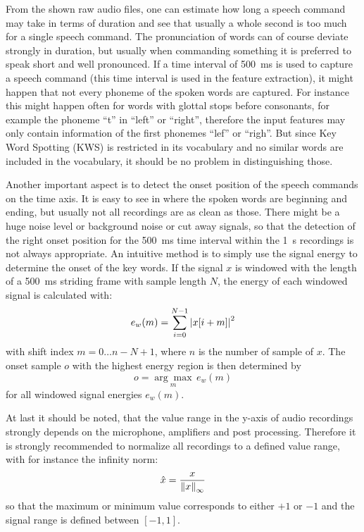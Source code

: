 From the shown raw audio files, one can estimate how long a speech command may take in terms of duration and see that usually a whole second is too much for a single speech command.
The pronunciation of words can of course deviate strongly in duration, but usually when commanding something it is preferred to speak short and well pronounced.
If a time interval of \SI{500}{\milli\second} is used to capture a speech command (this time interval is used in the feature extraction), it might happen that not every phoneme of the spoken words are captured. 
For instance this might happen often for words with glottal stops before consonants, for example the phoneme \enquote{t} in \enquote{left} or \enquote{right}, therefore the input features may only contain information of the first phonemes \enquote{lef} or \enquote{righ}.
But since Key Word Spotting (KWS) is restricted in its vocabulary and no similar words are included in the vocabulary, it should be no problem in distinguishing those.

Another important aspect is to detect the onset position of the speech commands on the time axis. 
It is easy to see in  where the spoken words are beginning and ending, but usually not all recordings are as clean as those.
There might be a huge noise level or background noise or cut away signals, so that the detection of the right onset position for the \SI{500}{\milli\second} time interval within the \SI{1}{\second} recordings is not always appropriate.
An intuitive method is to simply use the signal energy to determine the onset of the key words.
If the signal $x$ is windowed with the length of a \SI{500}{\milli\second} striding frame with sample length $N$, the energy of each windowed signal is calculated with:
\begin{equation}
  e_{w}(m) = \sum_{i=0}^{N-1} \abs{x[i + m]}^2
\end{equation}
with shift index $m = 0 \dots n - N + 1$, where $n$ is the number of sample of $x$.
The onset sample $o$ with the highest energy region is then determined by
\begin{equation}
  o = \underset{m}{\arg \max} \, e_{w}(m)
\end{equation}
for all windowed signal energies $e_{w}(m)$.

At last it should be noted, that the value range in the y-axis of audio recordings strongly depends on the microphone, amplifiers and post processing.
Therefore it is strongly recommended to normalize all recordings to a defined value range, with for instance the infinity norm:
\begin{equation}
  \hat{x} = \frac{x}{\norm{x}_\infty}
\end{equation}
so that the maximum or minimum value corresponds to either $+1$ or $-1$ and the signal range is defined between $[-1, 1]$.